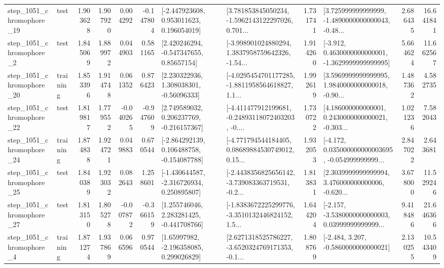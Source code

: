 \begin{tabular}{llrrrrllrlrr}
 step\_1051\_chromophore\_19 &      test &      1.903628 &    1.907920 &      0.004292 & -0.147804 &    [-2.447923608, 0.953011623, 0.196054019] &  [3.781853845050234, -1.5962143122297026, 0.701... &       1.731741 &  [3.725999999999999, -1.4890000000000043, -0.48... &            2.686435 &         16.641841 \\
  step\_1051\_chromophore\_2 &      test &      1.845069 &    1.889972 &      0.044903 &  0.581165 &     [2.420246294, -0.547347655, 0.85657154] &  [-3.998901024880294, 1.3837958759642326, -1.54... &       1.914260 &  [-3.912, 0.4630000000000001, -1.3629999999999995] &            5.664624 &         11.662567 \\
 step\_1051\_chromophore\_20 &  training &      1.853396 &    1.914748 &      0.061352 &  0.876423 &     [2.230322936, 1.308038301, -0.56096333] &  [-4.0295454701177285, -1.8811958564618827, 1.1... &       1.992619 &  [3.5969999999999995, 1.9840000000000018, -0.90... &            1.487362 &          4.582735 \\
 step\_1051\_chromophore\_22 &      test &      1.819817 &    1.779552 &     -0.040265 & -0.947609 &    [2.749589032, 0.206237769, -0.216157367] &  [-4.411477912199681, -0.24893118072403203, -0.... &       1.730722 &  [4.186000000000001, 0.2430000000000021, -0.303... &            1.021236 &          7.582043 \\
 step\_1051\_chromophore\_24 &  training &      1.874838 &    1.924721 &      0.049883 &  0.670544 &   [-2.864292139, 0.106488758, -0.154087788] &  [-4.771794544184405, 0.08689884530749012, 0.15... &       1.932053 &  [-4.172, 0.035000000000003695, -0.054999999999... &            2.847022 &          2.643681 \\
 step\_1051\_chromophore\_25 &      test &      1.840389 &    1.923032 &      0.082643 &  1.258601 &   [-1.430644587, -2.316726934, 0.250895807] &  [-2.4438356825656142, -3.739083363719531, -0.2... &       1.813831 &  [2.3039999999999994, 3.476000000000006, -0.620... &            3.678000 &         11.529246 \\
 step\_1051\_chromophore\_27 &      test &      1.813150 &    1.805278 &     -0.007872 & -0.366159 &    [1.255746046, 2.283281425, -0.441708766] &  [-1.8383672225299776, -3.3510132446824152, 1.5... &       1.644204 &  [-2.157, -3.5380000000000003, 0.03999999999999... &            9.418486 &         21.646366 \\
  step\_1051\_chromophore\_4 &  training &      1.871274 &    1.937869 &      0.066596 &  0.970544 &     [1.65997982, -2.196358085, 0.299026829] &  [2.6271318525786227, -3.6520324769171353, -0.1... &       1.808769 &               [-2.484, 3.207, -0.5860000000000021] &            2.130255 &         10.543409 \\

\end{tabular}
